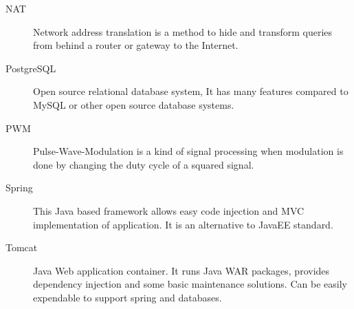 \begin{description}
	\item[NAT] Network address translation is a method to hide and transform queries from behind a router or gateway to the Internet.
	
	\item[PostgreSQL] Open source relational database system, It has many features compared to MySQL or other open source database systems.
	
	\item[PWM] Pulse-Wave-Modulation is a kind of signal processing when modulation is done by changing the duty cycle of a squared signal.
	
	\item[Spring] This Java based framework allows easy code injection and MVC implementation of application. It is an alternative to JavaEE standard.

	\item[Tomcat]  Java Web application container. It runs Java WAR packages, provides dependency injection and some basic maintenance solutions. Can be easily expendable to support spring and databases.
\end{description}
